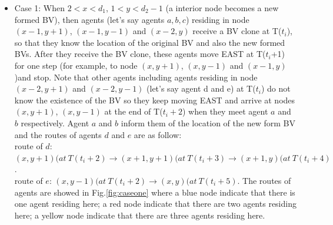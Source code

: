 \begin{itemize}
\item Case 1: When $2<x<d_1$, $1<y<d_2-1$ (a interior node becomes a new formed BV), then agents (let's say agents $a,b,c$) residing in node $(x-1, y+1)$, $(x-1, y-1)$ and $(x-2, y)$ receive a BV clone at T($t_i$), so that they know the location of the original BV and also the new formed BVs. After they receive the BV clone, these agents move EAST at T($t_i$+1) for one step (for example, to node $(x, y+1)$, $(x, y-1)$ and $(x-1, y)$ )and stop. Note that other agents including agents residing in node $(x-2, y+1)$ and $(x-2, y-1)$ (let's say agent d and e) at T($t_i$) do not know the existence of the BV so they keep moving EAST and arrive at nodes $(x, y+1)$, $(x, y-1)$ at the end of T($t_i+2$) when they meet agent $a$ and $b$ respectively. Agent $a$ and $b$ inform them of the location of the new form BV and the routes of agents $d$ and $e$ are as follow:\\
route of $d$: $(x, y+1)(at\ T(t_i+2){\rightarrow}(x+1,y+1)(at\ T(t_i+3){\rightarrow}(x+1,y)(at\ T(t_i+4)$.\\
route of $e$: $(x, y-1)(at\ T(t_i+2){\rightarrow}(x, y)(at\ T(t_i+5)$.
The routes of agents are showed in Fig.\ref{fig:caseone} where a blue node indicate that there is one agent residing here; a red node indicate that there are two agents residing here; a yellow node indicate that there are three agents residing here. 


\end{itemize}

